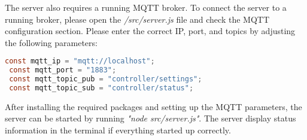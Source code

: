 The server also requires a running MQTT broker. To connect the server to a running broker, please open the \textit{/src/server.js} file and check the MQTT configuration section. Please enter the correct IP, port, and topics by adjusting the following parameters:

\begin{lstlisting}[language = Java, numbers = none]
 const mqtt_ip = "mqtt://localhost";
 const mqtt_port = "1883";
 const mqtt_topic_pub = "controller/settings";
 const mqtt_topic_sub = "controller/status";
\end{lstlisting}

After installing the required packages and setting up the MQTT parameters, the server can be started by running \textit{"node src/server.js"}. The server display status information in the terminal if everything started up correctly.